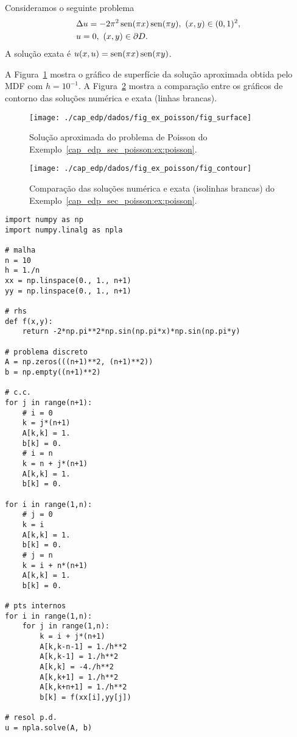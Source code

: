 \begin{ex}\label{cap_edp_sec_poisson:ex:poisson}
  Consideramos o seguinte problema
  \begin{subequations}
    \begin{align}
      &\Delta u = -2\pi^2\operatorname{sen}(\pi x)\operatorname{sen}(\pi y),~(x, y)\in (0, 1)^2,\\
      &u = 0, ~(x,y)\in\partial D.
    \end{align}
\end{subequations}
A solução exata é $u(x,u) = \operatorname{sen}(\pi x)\operatorname{sen}(\pi y)$.

A Figura~\ref{cap_edp_sec_poisson:fig:ex_poisson_a} mostra o gráfico de superfície da solução aproximada obtida pelo MDF com $h = 10^{-1}$. A Figura~\ref{cap_edp_sec_poisson:fig:ex_poisson_b} mostra a comparação entre os gráficos de contorno das soluções numérica e exata (linhas brancas).

\begin{figure}[H]
  \centering
  \texttt{[image: ./cap\_edp/dados/fig\_ex\_poisson/fig\_surface]}
  \caption{Solução aproximada do problema de Poisson do Exemplo~\ref{cap_edp_sec_poisson:ex:poisson}.}
  \label{cap_edp_sec_poisson:fig:ex_poisson_a}
\end{figure}

\begin{figure}[H]
  \centering
  \texttt{[image: ./cap\_edp/dados/fig\_ex\_poisson/fig\_contour]}
  \caption{Comparação das soluções numérica e exata (isolinhas brancas) do Exemplo~\ref{cap_edp_sec_poisson:ex:poisson}.}
  \label{cap_edp_sec_poisson:fig:ex_poisson_b}
\end{figure}

\begin{lstlisting}[caption=mdf\_poisson.py]
import numpy as np
import numpy.linalg as npla

# malha
n = 10
h = 1./n
xx = np.linspace(0., 1., n+1)
yy = np.linspace(0., 1., n+1)

# rhs
def f(x,y):
    return -2*np.pi**2*np.sin(np.pi*x)*np.sin(np.pi*y)

# problema discreto
A = np.zeros(((n+1)**2, (n+1)**2))
b = np.empty((n+1)**2)

# c.c.
for j in range(n+1):
    # i = 0
    k = j*(n+1)
    A[k,k] = 1.
    b[k] = 0.
    # i = n
    k = n + j*(n+1)
    A[k,k] = 1.
    b[k] = 0.

for i in range(1,n):
    # j = 0
    k = i
    A[k,k] = 1.
    b[k] = 0.
    # j = n
    k = i + n*(n+1)
    A[k,k] = 1.
    b[k] = 0.

# pts internos
for i in range(1,n):
    for j in range(1,n):
        k = i + j*(n+1)
        A[k,k-n-1] = 1./h**2
        A[k,k-1] = 1./h**2
        A[k,k] = -4./h**2
        A[k,k+1] = 1./h**2
        A[k,k+n+1] = 1./h**2
        b[k] = f(xx[i],yy[j])

# resol p.d.
u = npla.solve(A, b)
\end{lstlisting}

\end{ex}


